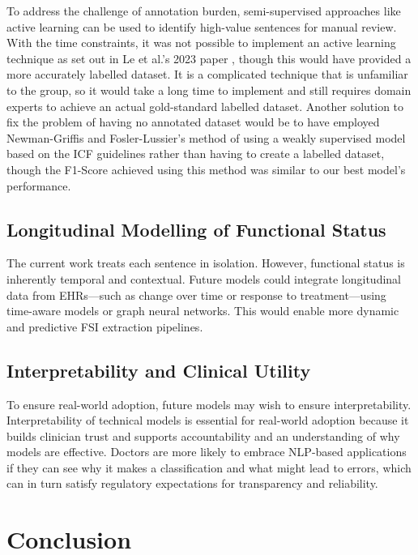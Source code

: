 To address the challenge of annotation burden, semi-supervised approaches like active learning can be used to identify high-value sentences for manual review. With the time constraints, it was not possible to implement an active learning technique as set out in  Le et al.’s 2023 paper \cite{le2023}, though this would have provided a more accurately labelled dataset. It is a complicated technique that is unfamiliar to the group, so it would take a long time to implement and still requires domain experts to achieve an actual gold-standard labelled dataset. Another solution to fix the problem of having no annotated dataset would be to have employed Newman-Griffis and Fosler-Lussier’s method \cite{newman-griffis2020auto} of using a weakly supervised model based on the ICF guidelines rather than having to create a labelled dataset, though the F1-Score achieved using this method was similar to our best model’s performance.

\subsection{Longitudinal Modelling of Functional Status}

The current work treats each sentence in isolation. However, functional status is inherently temporal and contextual. Future models could integrate longitudinal data from EHRs—such as change over time or response to treatment—using time-aware models or graph neural networks. This would enable more dynamic and predictive FSI extraction pipelines.

\subsection{Interpretability and Clinical Utility}

To ensure real-world adoption, future models may wish to ensure interpretability. Interpretability of technical models is essential for real-world adoption because it builds clinician trust and supports accountability and an understanding of why models are effective. Doctors are more likely to embrace NLP-based applications if they can see why it makes a classification and what might lead to errors, which can in turn satisfy regulatory expectations for transparency and reliability.

\section{Conclusion}

